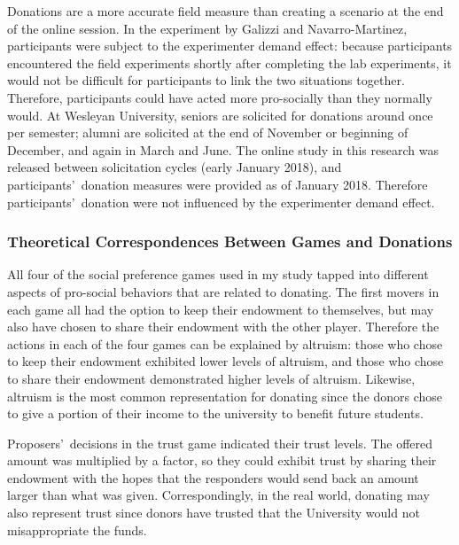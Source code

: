 \documentclass[12pt]{article}
\begin{document}
Donations are a more accurate field measure than creating a scenario at the end of the online session. In the experiment by Galizzi and Navarro-Martinez, participants were subject to the experimenter demand effect: because participants encountered the field experiments shortly after completing the lab experiments, it would not be difficult for participants to link the two situations together. Therefore, participants could have acted more pro-socially than they normally would. At Wesleyan University, seniors are solicited for donations around once per semester; alumni are solicited at the end of November or beginning of December, and again in March and June. The online study in this research was released between solicitation cycles (early January 2018), and participants\rq \ donation measures were provided as of January 2018. Therefore participants\rq \ donation were not influenced by the experimenter demand effect.


\subsubsection{Theoretical Correspondences Between Games and Donations}

All four of the social preference games used in my study tapped into different aspects of pro-social behaviors that are related to donating. The first movers in each game 
all had the option to keep their endowment to themselves, but may also have chosen to share their endowment with the other player. Therefore the actions in each of the four games can be explained by altruism: those who chose to keep their endowment exhibited lower levels of altruism, and those who chose to share their endowment demonstrated higher levels of altruism. Likewise, altruism is the most common representation for donating since the donors chose to give a portion of their income to the university to benefit future students.

Proposers\rq \ decisions in the trust game indicated their trust levels. The offered amount was multiplied by a factor, so they could exhibit trust by sharing their endowment with the hopes that the responders would send back an amount larger than what was given. Correspondingly, in the real world, donating may also represent trust since donors have trusted that the University would not misappropriate the funds.
\end{document}
